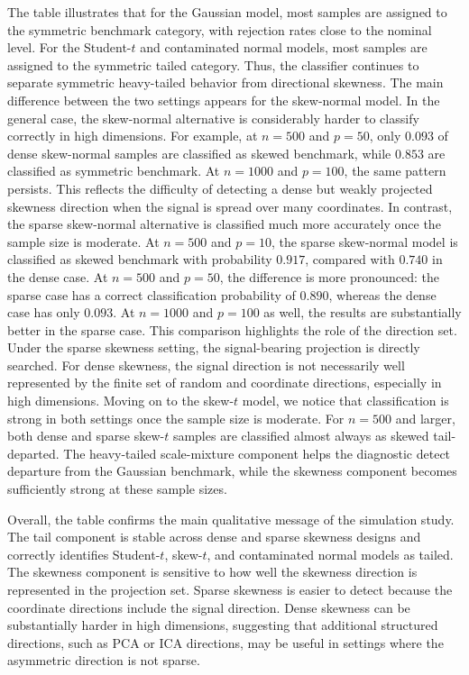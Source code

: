 \documentclass[11pt]{article}
\theoremstyle{plain}
\theoremstyle{definition}
\theoremstyle{remark}
\begin{document}
The table illustrates that for the Gaussian model, most samples are assigned to the symmetric benchmark category, with rejection rates close to the nominal level. For the Student-$t$ and contaminated normal models, most samples are assigned to the symmetric tailed category.  Thus, the classifier continues to separate symmetric heavy-tailed behavior from directional skewness. The main difference between the two settings appears for the skew-normal model.  In the general case, the skew-normal alternative is considerably harder to classify correctly in high dimensions.  For example, at $n=500$ and $p=50$, only $0.093$ of dense skew-normal samples are classified as skewed benchmark, while $0.853$ are classified as symmetric benchmark.  At $n=1000$ and $p=100$, the same pattern persists.  This reflects the difficulty of detecting a dense but weakly projected skewness direction when the signal is spread over many coordinates. In contrast, the sparse skew-normal alternative is classified much more accurately once the sample size is moderate.  At $n=500$ and $p=10$, the sparse skew-normal model is classified as skewed benchmark with probability $0.917$, compared with $0.740$ in the dense case. At $n=500$ and $p=50$, the difference is more pronounced: the sparse case has a correct classification probability of $0.890$, whereas the dense case has only $0.093$.  At $n=1000$ and $p=100$ as well, the results are substantially better in the sparse case.  This comparison highlights the role of the direction set. Under the sparse skewness setting, the signal-bearing projection is directly searched.  For dense skewness, the signal direction is not necessarily well represented by the finite set of random and coordinate directions, especially in high dimensions. Moving on to the skew-$t$ model, we notice that classification is strong in both settings once the sample size is moderate. For $n=500$ and larger, both dense and sparse skew-$t$ samples are classified almost always as skewed tail-departed.  The heavy-tailed scale-mixture component helps the diagnostic detect departure from the Gaussian benchmark, while the skewness component becomes sufficiently strong at these sample sizes.

Overall, the table confirms the main qualitative message of the simulation study.  The tail component is stable across dense and sparse skewness designs and correctly identifies Student-$t$, skew-$t$, and contaminated normal models as tailed.  The skewness component is sensitive to how well the skewness direction is represented in the projection set.  Sparse skewness is easier to detect because the coordinate directions include the signal direction.  Dense skewness can be substantially harder in high dimensions, suggesting that additional structured directions, such as PCA or ICA directions, may be useful in settings where the asymmetric direction is not sparse.
\end{document}
